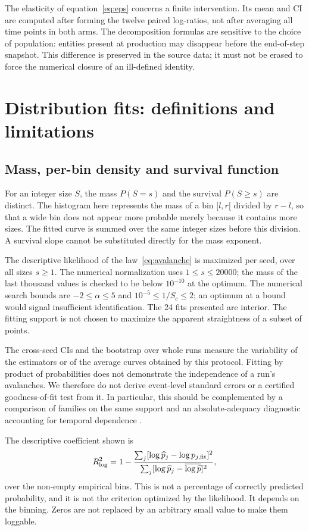 The elasticity of equation~\eqref{eq:eps} concerns a finite
intervention. Its mean and CI are computed after forming the twelve
paired log-ratios, not after averaging all time points
in both arms. The decomposition formulas are sensitive to the
choice of population: entities present at production may
disappear before the end-of-step snapshot. This difference is
preserved in the source data; it must not be erased to
force the numerical closure of an ill-defined identity.

\section{Distribution fits: definitions and limitations}\label{sec:ajustements}
\subsection{Mass, per-bin density and survival function}
For an integer size $S$, the mass $P(S=s)$ and the survival
$P(S\ge s)$ are distinct. The histogram here represents the mass
of a bin $[l,r[$ divided by $r-l$, so that a wide bin does not
appear more probable merely because it contains more
sizes. The fitted curve is summed over the same integer sizes
before this division. A survival slope cannot be
substituted directly for the mass exponent.

The descriptive likelihood of the law~\eqref{eq:avalanche} is maximized
per seed, over all sizes $s\ge1$. The numerical normalization
uses $1\le s\le20000$; the mass of the last thousand values is
checked to be below $10^{-10}$ at the optimum. The numerical search
bounds are $-2\le\alpha\le5$ and
$10^{-5}\le1/S_c\le2$; an optimum at a bound would signal
insufficient identification. The 24 fits presented are interior.
The fitting support is not chosen to maximize the apparent
straightness of a subset of points.

The cross-seed CIs and the bootstrap over whole runs measure the
variability of the estimators or of the average curves obtained by this
protocol. Fitting by product of probabilities does not demonstrate
the independence of a run's avalanches. We therefore do not derive
event-level standard errors or a certified goodness-of-fit test from it.
In particular, this should be complemented by a comparison of families on
the same support and an absolute-adequacy diagnostic accounting
for temporal dependence \cite{clauset}.

The descriptive coefficient shown is
\[
 R^2_{\log}=1-
 \frac{\sum_j[\log\widehat p_j-\log p_{j,\rm fit}]^2}
      {\sum_j[\log\widehat p_j-\overline{\log\widehat p}]^2},
\]
over the non-empty empirical bins. This is not a percentage
of correctly predicted probability, and it is not the criterion
optimized by the likelihood. It depends on the binning. Zeros are
not replaced by an arbitrary small value to make them
loggable.

